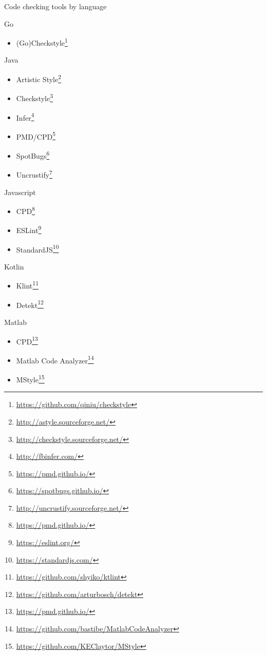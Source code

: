\documentclass[presentation]{beamer}
\newcommand{\fnurl}[1]{\footnote{\url{#1}}}
\begin{document}
\begin{frame}{Code checking tools by language}
\begin{block}{Go}
\begin{itemize}
            \item (Go)Checkstyle\fnurl{https://github.com/qiniu/checkstyle}
        \end{itemize}
    \end{block}
    \begin{block}{Java}
        \begin{itemize}
            \item Artistic Style\fnurl{http://astyle.sourceforge.net/}
            \item Checkstyle\fnurl{http://checkstyle.sourceforge.net/}
            \item Infer\fnurl{http://fbinfer.com/}
            \item PMD/CPD\fnurl{https://pmd.github.io/}
            \item SpotBugs\fnurl{https://spotbugs.github.io/}
            \item Uncrustify\fnurl{http://uncrustify.sourceforge.net/}
        \end{itemize}
    \end{block}
    \begin{block}{Javascript}
        \begin{itemize}
            \item CPD\fnurl{https://pmd.github.io/}
            \item ESLint\fnurl{https://eslint.org/}
            \item StandardJS\fnurl{https://standardjs.com/}
        \end{itemize}
    \end{block}
    \begin{block}{Kotlin}
        \begin{itemize}
            \item Klint\fnurl{https://github.com/shyiko/ktlint}
            \item Detekt\fnurl{https://github.com/arturbosch/detekt}
        \end{itemize}
    \end{block}
    \begin{block}{Matlab}
        \begin{itemize}
            \item CPD\fnurl{https://pmd.github.io/}
            \item Matlab Code Analyzer\fnurl{https://github.com/bastibe/MatlabCodeAnalyzer}
            \item MStyle\fnurl{https://github.com/KEClaytor/MStyle}
        \end{itemize}

\end{block}
\end{frame}
\end{document}
